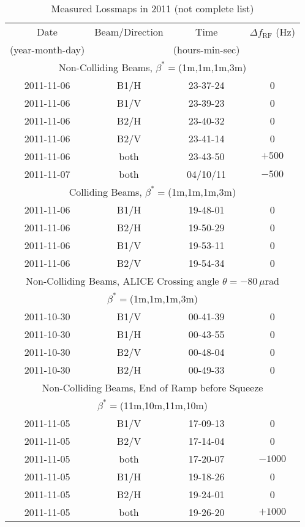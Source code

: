 \begin{table}[htbp]
\caption{Measured Lossmaps in 2011 (not complete list)}
\begin{center}
\begin{tabular}{cccc}
\toprule
Date & Beam/Direction & Time & $\Delta f_{\text{RF}}$ (Hz) \\ %
(year-month-day) &  & (hours-min-sec) &  \\ \toprule %
\multicolumn{4}{c}{Non-Colliding Beams, $\beta^*=$(1m,1m,1m,3m)}  \\ \midrule
2011-11-06 & B1/H & 23-37-24 & 0 \\ %
2011-11-06 & B1/V & 23-39-23 & 0 \\ %
2011-11-06 & B2/H & 23-40-32 & 0 \\ %
2011-11-06 & B2/V & 23-41-14 & 0 \\ %
2011-11-06 & both & 23-43-50 & $+500$ \\ %
2011-11-07 & both & 04/10/11 & $-500$ \\ \midrule
\multicolumn{4}{c}{Colliding Beams, $\beta^*=$(1m,1m,1m,3m)}  \\ \midrule
2011-11-06 & B1/H & 19-48-01 & 0 \\ %
2011-11-06 & B2/H & 19-50-29 & 0 \\ 
2011-11-06 & B1/V & 19-53-11 & 0 \\
2011-11-06 & B2/V & 19-54-34 & 0 \\ \midrule
\multicolumn{4}{c}{Non-Colliding Beams, ALICE Crossing angle $\theta = -80 \, \mu$rad}  \\ %
\multicolumn{4}{c}{$\beta^*=$(1m,1m,1m,3m)}  \\ \midrule
2011-10-30 & B1/V & 00-41-39 & 0 \\ %
2011-10-30 & B1/H & 00-43-55 & 0 \\
2011-10-30 & B2/V & 00-48-04 & 0 \\ 
2011-10-30 & B2/H & 00-49-33 & 0 \\ \midrule
\multicolumn{4}{c}{Non-Colliding Beams, End of Ramp before Squeeze}  \\ %
\multicolumn{4}{c}{$\beta^*=$(11m,10m,11m,10m)}  \\ \midrule
2011-11-05 & B1/V & 17-09-13 & 0  \\ %
2011-11-05 & B2/V & 17-14-04 & 0 \\ %
2011-11-05 & both & 17-20-07 & $-1000$ \\ %
2011-11-05 & B1/H & 19-18-26 & 0 \\ %
2011-11-05 & B2/H & 19-24-01 & 0 \\ %
2011-11-05 & both & 19-26-20 & $+1000$ \\ \bottomrule
\end{tabular}
\end{center}
\label{tab:14051601}
\end{table}








